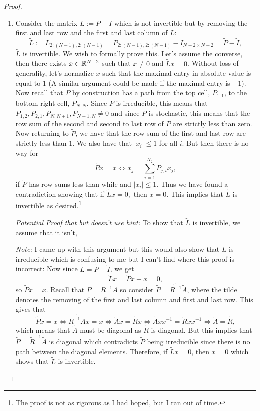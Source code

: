 \documentclass[12pt]{report}
\newenvironment{problem}{}{\newpage}
\begin{document}
\begin{problem}
\begin{proof}
\begin{enumerate}
    \item
    Consider the matrix $L := P - I$ which is not invertible but by removing the first and last row and the first and last column of $L$:
    \begin{equation*}
        \tilde{L} := L_{2:(N-1),2:(N-1)} = P_{2:(N-1),2:(N-1)} - I_{N-2\times N-2} = \tilde{P} - \tilde{I},
    \end{equation*}
    $\tilde{L}$ is invertible. We wish to formally prove this. Let's assume the converse, then there exists $x \in {\mathbb R}^{N -2}$ such that $x \neq 0$  and $\tilde{L}x = 0$. Without loss of generality, let's normalize $x$ such that the maximal entry in absolute value is equal to $1$ (A similar argument could be made if the maximal entry is $-1$). Now recall that $P$ by construction has a path from the top cell, $P_{1,1}$, to the bottom right cell, $P_{N,N}$. Since $P$ is irreducible, this means that $P_{1,2},P_{2,1},P_{N,N+1},P_{N+1,N} \neq 0$ and since $P$ is stochastic, this means that the row sum of the second and second to last row of $P$ are strictly less than zero. Now returning to $\tilde{P}$, we have that the row sum of the first and last row are strictly less than $1$. We also have that $|x_i| \leq 1$ for all $i$. But then there is no way for 
    \begin{equation*}
        \tilde{P}x = x \iff x_j = \sum_{i=1}^{N_2}P_{j,i}x_j,
    \end{equation*}
    if $\tilde{P}$ has row sums less than while and $|x_i| \leq 1$. Thus we have found a contradiction showing that if $\tilde{L}x = 0,$ then $x=0$. This implies that $\tilde{L}$ is invertible as desired.\footnote{The proof is not as rigorous as I had hoped, but I ran out of time.}
    
    \textit{Potential Proof that but doesn't use hint:} To show that $\tilde{L}$ is invertible, we assume that it isn't,

    \textit{Note:} I came up with this argument but this would also show that $L$ is irreducible which is confusing to me but I can't find where this proof is incorrect: Now since $\tilde{L}=\tilde{P}-\tilde{I}$, we get 
    \begin{equation*}
        \tilde{L}x = \tilde{P}x - x = 0,
    \end{equation*}
    so $\tilde{P}x = x$. Recall that $P = R^{-1}A$ so consider $\tilde{P} = \tilde{R^{-1}}\tilde{A}$, where the tilde denotes the removing of the first and last column and first and last row. This gives that
    \begin{equation*}
        \tilde{P}x = x \iff \tilde{R^{-1}A}x = x \iff \tilde{A}x = \tilde{R}x \iff \tilde{A}xx^{-1} = \tilde{R}xx^{-1} \iff \tilde{A} = \tilde{R},
    \end{equation*}
    which means that $\tilde{A}$ must be diagonal as $\tilde{R}$ is diagonal. But this implies that $\tilde{P} = \tilde{R}^{-1}\tilde{A}$ is diagonal which contradicts $\tilde{P}$ being irreducible since there is no path between the diagonal elements. Therefore, if $\tilde{L}x = 0$, then $x = 0$ which shows that $\tilde{L}$ is invertible. 


\end{enumerate}
\end{proof}
\end{problem}
\end{document}
